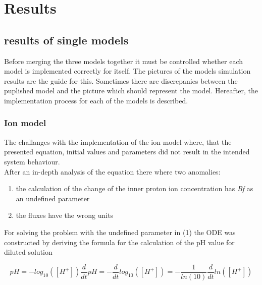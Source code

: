 \section{Results}
\subsection{results of single models}
Before merging the three models together it must be controlled whether each model is implemented correctly for itself. The pictures of the models simulation results are the guide for this. Sometimes there are discrepanies between the puplished model and the picture which should represent the model.  Hereafter, the implementation process for each of the models is described.

\subsubsection{Ion model}
The challanges with the implementation of the ion model where, that the presented equation, initial values and parameters did not result in the intended system behaviour. \\
After an in-depth analysis of the equation there where two anomalies:

\begin{enumerate}
	\item the calculation of the change of the inner proton ion concentration has \emph{Bf} as an undefined parameter
	\item the fluxes have the wrong units
\end{enumerate}
For solving the problem with the undefined parameter in (1) the ODE was constructed by deriving the formula for the calculation of the pH value for diluted solution 

\begin{equation*}
pH = - log_{10}([H^+])
\frac{d}{dt} pH = - \frac{d}{dt} log_{10}([H^+])
= - \frac{1}{ln(10)} \frac{d}{dt}ln([H^+])
\end{equation*}


